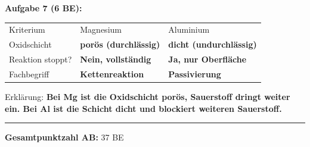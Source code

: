 \documentclass[11pt, a4paper]{article}
\newcommand{\lsg}[1]{\textcolor{loesung}{\textbf{#1}}}
\begin{document}
\textbf{Aufgabe 7 (6 BE):}

\begin{tabular}{lll}
Kriterium & Magnesium & Aluminium \\
Oxidschicht & \lsg{porös (durchlässig)} & \lsg{dicht (undurchlässig)} \\
Reaktion stoppt? & \lsg{Nein, vollständig} & \lsg{Ja, nur Oberfläche} \\
Fachbegriff & \lsg{Kettenreaktion} & \lsg{Passivierung}
\end{tabular}

Erklärung: \lsg{Bei Mg ist die Oxidschicht porös, Sauerstoff dringt weiter ein. Bei Al ist die Schicht dicht und blockiert weiteren Sauerstoff.}

\vfill
\hrule
\vspace{0.3em}
\textbf{Gesamtpunktzahl AB:} 37 BE
\end{document}
